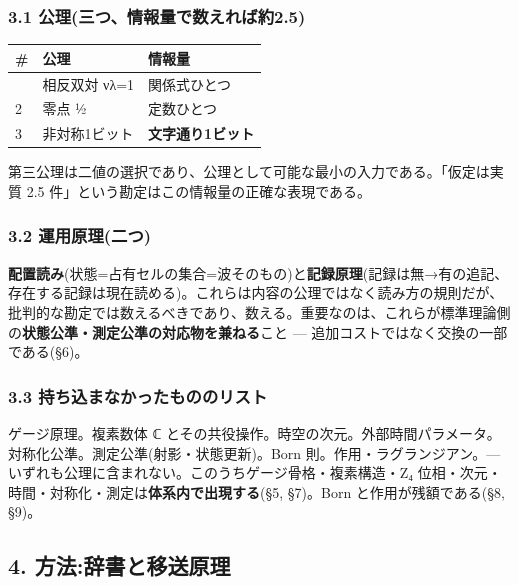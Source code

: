 \documentclass[
]{ltjsarticle}
\newcounter{none} %
\begin{document}
\subsubsection{3.1
公理(三つ、情報量で数えれば約2.5)}\label{ux516cux7406ux4e09ux3064ux60c5ux5831ux91cfux3067ux6570ux3048ux308cux3070ux7d042.5}

{\def\LTcaptype{none} %
\begin{longtable}[]{@{}lll@{}}
\toprule\noalign{}
\# & 公理 & 情報量 \\
\midrule\noalign{}
\endhead
\bottomrule\noalign{}
\endlastfoot
1 & 相反双対 νλ=1 & 関係式ひとつ \\
2 & 零点 ½ & 定数ひとつ \\
3 & 非対称1ビット & \textbf{文字通り1ビット} \\
\end{longtable}
}

第三公理は二値の選択であり、公理として可能な最小の入力である。「仮定は実質
2.5 件」という勘定はこの情報量の正確な表現である。

\subsubsection{3.2
運用原理(二つ)}\label{ux904bux7528ux539fux7406ux4e8cux3064}

\textbf{配置読み}(状態=占有セルの集合=波そのもの)と\textbf{記録原理}(記録は無→有の追記、存在する記録は現在読める)。これらは内容の公理ではなく読み方の規則だが、批判的な勘定では数えるべきであり、数える。重要なのは、これらが標準理論側の\textbf{状態公準・測定公準の対応物を兼ねる}こと
--- 追加コストではなく交換の一部である(§6)。

\subsubsection{3.3
持ち込まなかったもののリスト}\label{ux6301ux3061ux8fbcux307eux306aux304bux3063ux305fux3082ux306eux306eux30eaux30b9ux30c8}

ゲージ原理。複素数体 ℂ
とその共役操作。時空の次元。外部時間パラメータ。対称化公準。測定公準(射影・状態更新)。Born
則。作用・ラグランジアン。---
いずれも公理に含まれない。このうちゲージ骨格・複素構造・Z₄
位相・次元・時間・対称化・測定は\textbf{体系内で出現する}(§5, §7)。Born
と作用が残額である(§8, §9)。

\subsection{4.
方法:辞書と移送原理}\label{ux65b9ux6cd5ux8f9eux66f8ux3068ux79fbux9001ux539fux7406}
\end{document}
